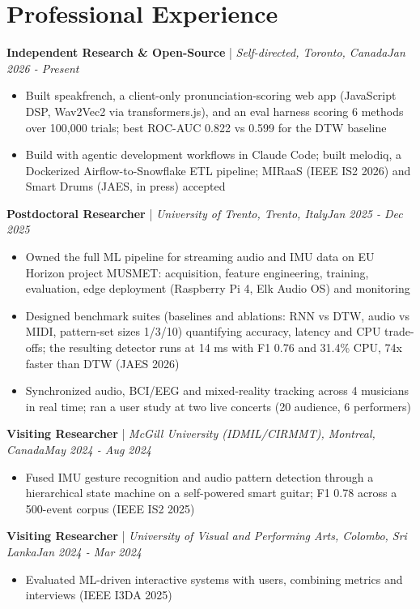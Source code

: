\documentclass[11pt]{article}
\newenvironment{cvrole}[5]{%
  \par\noindent\textbf{\large #1} | \textit{\small #2, #3}\hfill \textit{\small #4 - #5}\par
  \begin{itemize}[leftmargin=2em, itemsep=-0.3em, topsep=-0.5em]%
}{%
  \end{itemize}\par\noindent\mbox{}\par\vspace{0.1em}%
}
\begin{document}
\section*{Professional Experience}

\begin{cvrole}{Independent Research \& Open-Source}{Self-directed}{Toronto, Canada}{Jan 2026}{Present}
    \item Built speakfrench, a client-only pronunciation-scoring web app (JavaScript DSP, Wav2Vec2 via transformers.js), and an eval harness scoring 6 methods over 100,000 trials; best ROC-AUC 0.822 vs 0.599 for the DTW baseline
    \item Build with agentic development workflows in Claude Code; built melodiq, a Dockerized Airflow-to-Snowflake ETL pipeline; MIRaaS (IEEE IS2 2026) and Smart Drums (JAES, in press) accepted
\end{cvrole}

\begin{cvrole}{Postdoctoral Researcher}{University of Trento}{Trento, Italy}{Jan 2025}{Dec 2025}
    \item Owned the full ML pipeline for streaming audio and IMU data on EU Horizon project MUSMET: acquisition, feature engineering, training, evaluation, edge deployment (Raspberry Pi 4, Elk Audio OS) and monitoring
    \item Designed benchmark suites (baselines and ablations: RNN vs DTW, audio vs MIDI, pattern-set sizes 1/3/10) quantifying accuracy, latency and CPU trade-offs; the resulting detector runs at 14 ms with F1 0.76 and 31.4\% CPU, 74x faster than DTW (JAES 2026)
    \item Synchronized audio, BCI/EEG and mixed-reality tracking across 4 musicians in real time; ran a user study at two live concerts (20 audience, 6 performers)
\end{cvrole}

\begin{cvrole}{Visiting Researcher}{McGill University (IDMIL/CIRMMT)}{Montreal, Canada}{May 2024}{Aug 2024}
    \item Fused IMU gesture recognition and audio pattern detection through a hierarchical state machine on a self-powered smart guitar; F1 0.78 across a 500-event corpus (IEEE IS2 2025)
\end{cvrole}

\begin{cvrole}{Visiting Researcher}{University of Visual and Performing Arts}{Colombo, Sri Lanka}{Jan 2024}{Mar 2024}
    \item Evaluated ML-driven interactive systems with users, combining metrics and interviews (IEEE I3DA 2025)
\end{cvrole}
\end{document}
